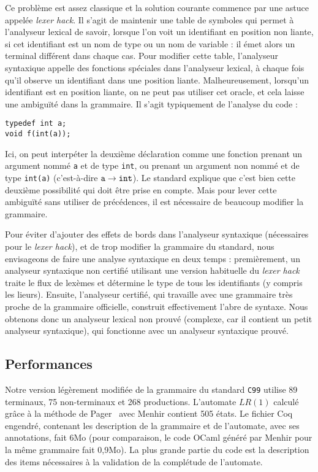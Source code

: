 \documentclass[a4paper,11pt]{article}
\begin{document}
Ce problème est assez classique et la solution courante commence par une
astuce appelée \emph{lexer hack}. Il s'agit de maintenir une table de
symboles qui permet à l'analyseur lexical de savoir, lorsque l'on
voit un identifiant en position non liante, si cet identifiant est un
nom de type ou un nom de variable : il émet alors un terminal
différent dans chaque cas. Pour modifier cette table, l'analyseur
syntaxique appelle des fonctions spéciales dans l'analyseur lexical, à
chaque fois qu'il observe un identifiant dans une position
liante. Malheureusement, lorsqu'un identifiant est en position liante,
on ne peut pas utiliser cet oracle, et cela laisse une ambiguïté dans
la grammaire. Il s'agit typiquement de l'analyse du code :

\begin{verbatim}
typedef int a;
void f(int(a));
\end{verbatim}

Ici, on peut interpéter la deuxième déclaration comme une fonction
prenant un argument nommé \verb+a+ et de type \verb+int+, ou prenant un
argument non nommé et de type \verb+int(a)+ (c'est-à-dire $\verb+a+
\rightarrow \verb+int+$). Le standard explique que c'est bien cette
deuxième possibilité qui doit être prise en compte. Mais pour
lever cette ambiguïté sans utiliser de précédences, il est nécessaire
de beaucoup modifier la grammaire.

Pour éviter d'ajouter des effets de bords dans l'analyseur syntaxique
(nécessaires pour le \emph{lexer hack}), et de trop modifier la
grammaire du standard, nous envisageons de faire une analyse
syntaxique en deux temps : premièrement, un analyseur syntaxique
non certifié utilisant une version habituelle du \emph{lexer hack}
traite le flux de lexèmes et détermine le type de tous les
identifiants (y compris les lieurs). Ensuite, l'analyseur certifié,
qui travaille avec une grammaire très proche de la grammaire
officielle, construit effectivement l'abre de syntaxe. Nous obtenons
donc un analyseur lexical non prouvé (complexe, car il contient un
petit analyseur syntaxique), qui fonctionne avec un analyseur
syntaxique prouvé.

\subsection{Performances}

Notre version légèrement modifiée de la grammaire du standard
\texttt{C99} utilise 89 terminaux, 75 non-terminaux et 268
productions. L'automate $LR(1)$ calculé grâce à la méthode de
Pager~\cite{pager} avec Menhir contient 505 états. Le fichier Coq
engendré, contenant les description de la grammaire et de l'automate,
avec ses annotations, fait 6Mo (pour comparaison, le code OCaml généré
par Menhir pour la même grammaire fait 0,9Mo). La plus grande partie
du code est la description des items nécessaires à la validation de la
complétude de l'automate.
\end{document}
